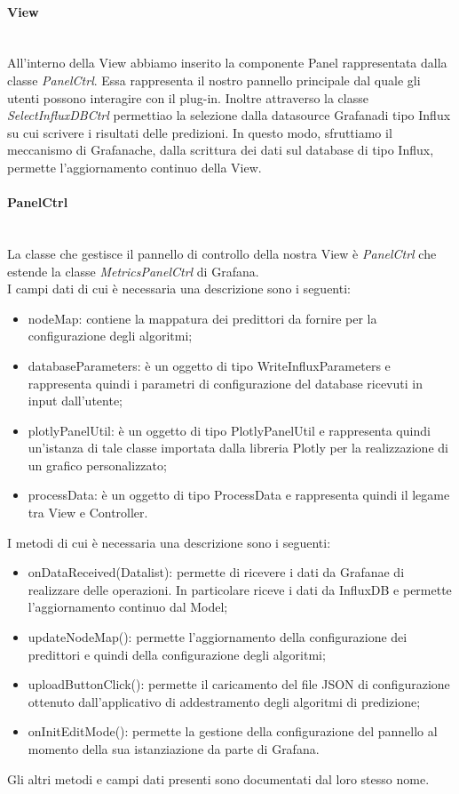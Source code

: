 \paragraph{View} \mbox{}\\ [1mm]
All'interno della View abbiamo inserito la componente Panel rappresentata dalla classe \textit{PanelCtrl}. Essa rappresenta il nostro pannello principale dal quale gli utenti possono interagire con il plug-in.
Inoltre attraverso la classe \textit{SelectInfluxDBCtrl} permettiao la selezione dalla datasource Grafana\glosp di tipo Influx su cui scrivere i risultati delle predizioni. In questo modo, sfruttiamo il meccanismo di Grafana\glosp che, dalla scrittura dei dati sul database di tipo Influx, permette l'aggiornamento continuo della View.
\paragraph*{PanelCtrl} \mbox{}\\ [1mm]
La classe che gestisce il pannello di controllo della nostra View è \textit{PanelCtrl} che estende la classe \textit{MetricsPanelCtrl} di Grafana\glo. \\
I campi dati di cui è necessaria una descrizione sono i seguenti:
\begin{itemize}
	\item nodeMap: contiene la mappatura dei predittori da fornire per la configurazione degli algoritmi;
	\item databaseParameters: è un oggetto di tipo WriteInfluxParameters e rappresenta quindi i parametri di configurazione del database ricevuti in input dall'utente;
	\item plotlyPanelUtil: è un oggetto di tipo PlotlyPanelUtil e rappresenta quindi un'istanza di tale classe importata dalla libreria Plotly per la realizzazione di un grafico personalizzato;
	\item processData: è un oggetto di tipo ProcessData e rappresenta quindi il legame tra View e Controller.
\end{itemize}
I metodi di cui è necessaria una descrizione sono i seguenti:
\begin{itemize}
	\item onDataReceived(Datalist): permette di ricevere i dati da Grafana\glosp e di realizzare delle operazioni. In particolare riceve i dati da InfluxDB e permette l'aggiornamento continuo dal Model;
	\item updateNodeMap(): permette l'aggiornamento della configurazione dei predittori e quindi della configurazione degli algoritmi;
	\item uploadButtonClick(): permette il caricamento del file JSON di configurazione ottenuto dall'applicativo di addestramento degli algoritmi di predizione;
	\item onInitEditMode(): permette la gestione della configurazione del pannello al momento della sua istanziazione da parte di Grafana\glo.
\end{itemize}
Gli altri metodi e campi dati presenti sono documentati dal loro stesso nome.
